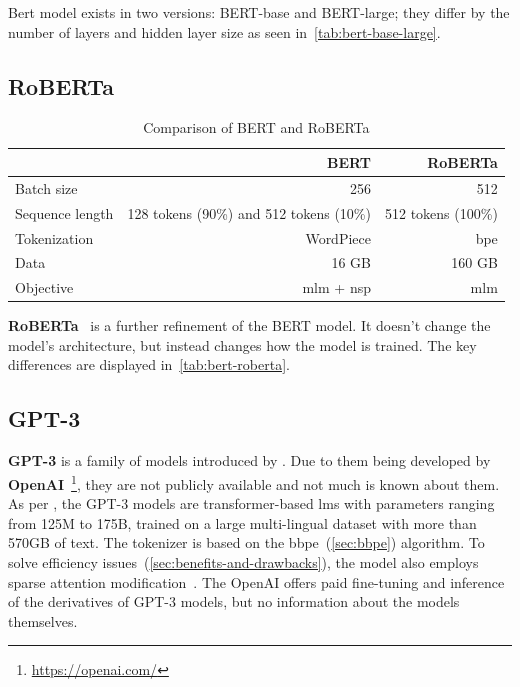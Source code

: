 Bert model exists in two versions: BERT-base and BERT-large;
they differ by the number of layers and hidden layer size as seen in~\autoref{tab:bert-base-large}.


\subsection{RoBERTa}

\begin{table}[h]
    \centering\footnotesize\sf
    \begin{tabular}{lrr}
        \toprule
        {}              & BERT                                    & RoBERTa            \\
        \midrule
        Batch size      & 256                                     & 512                \\
        Sequence length & 128 tokens (90\%) and 512 tokens (10\%) & 512 tokens (100\%) \\
        Tokenization    & WordPiece                               & \ac{bpe}           \\
        Data            & 16 GB                                   & 160 GB             \\
        Objective       & \ac{mlm} + \ac{nsp}                     & \ac{mlm}           \\
        \bottomrule
    \end{tabular}
    \caption{Comparison of BERT and RoBERTa}
    \label{tab:bert-roberta}
\end{table}

\textbf{RoBERTa}~\parencite{liuRoBERTaRobustlyOptimized2019} is a further refinement of the BERT model.
It doesn't change the model's architecture, but instead changes how the model is trained.
The key differences are displayed in~\autoref{tab:bert-roberta}.

\subsection{GPT-3}
\textbf{GPT-3} is a family of models introduced by \textcite{brownLanguageModelsAre2020b}.
Due to them being developed by \textbf{OpenAI}~\footnote{\url{https://openai.com/}}, they are not publicly available and not much is known about them.
As per \textcite{brownLanguageModelsAre2020b}, the GPT-3 models are transformer-based \acp{lm} with parameters ranging from 125M to 175B, trained on
a large multi-lingual dataset with more than 570GB of text. The tokenizer is based on the \ac{bbpe}~(\autoref{sec:bbpe}) algorithm.
To solve efficiency issues~(\autoref{sec:benefits-and-drawbacks}), the model also employs sparse attention modification~\parencite{childGeneratingLongSequences2019}.
The OpenAI offers paid fine-tuning and inference of the derivatives of GPT-3 models, but no information about the models themselves.

